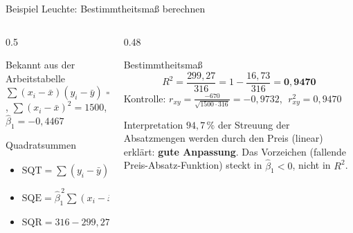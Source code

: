 \documentclass[aspectratio=169,11pt]{beamer}
\newcommand{\mindestzeilenabstand}{%
  \setlength{\lineskiplimit}{2pt}\setlength{\lineskip}{2pt}%
  \setlength{\normallineskiplimit}{2pt}\setlength{\normallineskip}{2pt}}
\begin{document}
\begin{frame}{Beispiel Leuchte: Bestimmtheitsmaß berechnen}
  \begin{columns}[T]
    \begin{column}{0.5\textwidth}
      \small\mindestzeilenabstand
      \begin{block}{Bekannt aus der Arbeitstabelle}
        $\sum (x_i-\bar{x})(y_i-\bar{y}) = -670$, \quad $\sum (x_i-\bar{x})^{2} = 1500$,\\
        $\hat{\beta}_1 = -0{,}4467$
      \end{block}
      \begin{block}{Quadratsummen}
        \begin{itemize}
          \item $\text{SQT} = \sum (y_i - \bar{y})^{2} = 10^{2} + 7^{2} + \ldots + (-8)^{2} = 316$
          \item $\text{SQE} = \hat{\beta}_1^{\,2} \sum (x_i-\bar{x})^{2} = \bigl(\tfrac{-670}{1500}\bigr)^{2} \cdot 1500 = 299{,}27$
          \item $\text{SQR} = 316 - 299{,}27 = 16{,}73$
        \end{itemize}
      \end{block}
    \end{column}
    \begin{column}{0.48\textwidth}
      \small
      \begin{exampleblock}{Bestimmtheitsmaß}
        \vspace{2pt}
        \[
          R^{2} = \frac{299{,}27}{316} = 1 - \frac{16{,}73}{316} = \mathbf{0{,}9470}
        \]
        Kontrolle: $r_{xy} = \frac{-670}{\sqrt{1500 \cdot 316}} = -0{,}9732$,
        $\;r_{xy}^{2} = 0{,}9470$ \checkmark
      \end{exampleblock}
      \begin{alertblock}{Interpretation}
        $94{,}7\,\%$ der Streuung der Absatzmengen werden durch den Preis
        (linear) erklärt: \textbf{gute Anpassung}. Das Vorzeichen (fallende
        Preis-Absatz-Funktion) steckt in $\hat{\beta}_1 < 0$, nicht in $R^{2}$.
      \end{alertblock}
    \end{column}
  \end{columns}
\end{frame}
\end{document}
